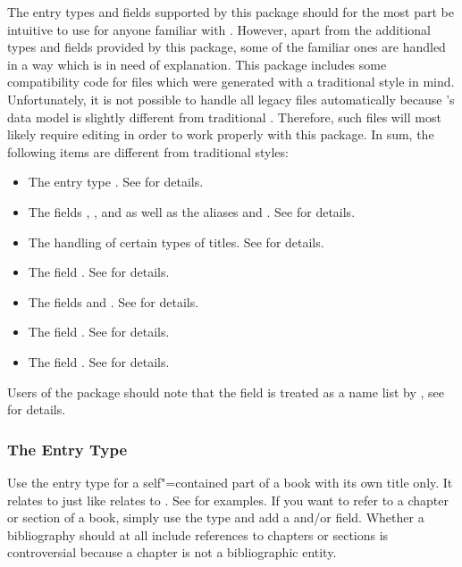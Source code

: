 \documentclass{ltxdockit}[2011/03/25]
\newcommand*{\biblatex}{\sty{biblatex}\xspace}
\begin{document}
The entry types and fields supported by this package should for the most part be intuitive to use for anyone familiar with \bibtex. However, apart from the additional types and fields provided by this package, some of the familiar ones are handled in a way which is in need of explanation.
This package includes some compatibility code for  files which were generated with a traditional \bibtex style in mind. Unfortunately, it is not possible to handle all legacy files automatically because \biblatex's data model is slightly different from traditional \bibtex. Therefore, such  files will most likely require editing in order to work properly with this package. In sum, the following items are different from traditional \bibtex styles:

\begin{itemize}
\setlength{\itemsep}{0pt}
\item The entry type . See  for details.
\item The fields , , and  as well as the aliases  and . See  for details.
\item The handling of certain types of titles. See  for details.
\item The field . See  for details.
\item The fields  and . See  for details.
\item The field . See  for details.
\item The field . See  for details.
\end{itemize}

Users of the  package should note that the  field is treated as a name list by \biblatex, see  for details.

\subsubsection{The Entry Type }
\label{bib:use:inb}

Use the  entry type for a self"=contained part of a book with its own title only. It relates to  just like  relates to . See  for examples. If you want to refer to a chapter or section of a book, simply use the  type and add a  and\slash or  field. Whether a bibliography should at all include references to chapters or sections is controversial because a chapter is not a bibliographic entity.
\end{document}
